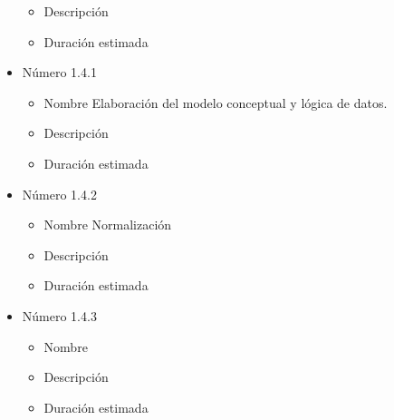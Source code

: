 \documentclass[11pt,a4paper,spanish,twoside]{report}
\begin{document}
\begin{itemize}
\begin{itemize}
\item{Descripción} 
\item{Duración estimada} 
\end{itemize}
\item{Número} 1.4.1
\begin{itemize}
\item{Nombre} Elaboración del modelo conceptual y lógica de datos.
\item{Descripción}
\item{Duración estimada} 
\end{itemize}
\item{Número} 1.4.2
\begin{itemize}
\item{Nombre} Normalización
\item{Descripción}
\item{Duración estimada} 
\end{itemize}
\item{Número} 1.4.3
\begin{itemize}
\item{Nombre} 
\item{Descripción}
\item{Duración estimada} 
\end{itemize}
\end{itemize}




\end{document}
